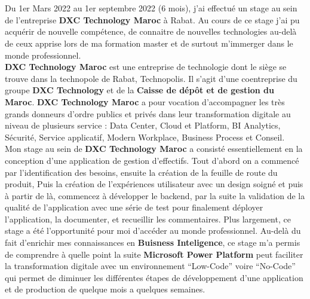 \titlespacing*{\chapter}{0pt}{0in}{0.3in}
\chapter*{}
\titlespacing*{\chapter}{0pt}{0.45in}{0.3in}%

Du 1er Mars 2022 au 1er septembre 2022 (6 mois), j’ai effectué un stage au sein de l’entreprise \textbf{DXC Technology Maroc} à Rabat. Au cours de ce stage j'ai pu acquérir de nouvelle compétence, de connaitre de nouvelles technologies au-delà de ceux apprise lors de ma formation master et de surtout m'immerger dans le monde professionnel. \\ 

\textbf{DXC Technology Maroc} est une entreprise de technologie dont le siège se trouve dans la technopole de Rabat, Technopolis. Il s’agit d’une coentreprise du groupe \textbf{DXC Technology} et de la \textbf{Caisse de dépôt et de gestion du Maroc}. \textbf{DXC Technology Maroc} a pour vocation d’accompagner les très grands donneurs d’ordre publics et privés dans leur transformation digitale au niveau de plusieurs service : Data Center, Cloud et Platform, BI Analytics, Sécurité, Service applicatif, Modern Workplace, Business Process et Conseil.\\ 

Mon stage au sein de \textbf{DXC Technology Maroc} a consisté essentiellement en la conception d'une application de gestion d'effectifs. Tout d'abord on a commencé par l'identification des besoins, ensuite la création de la feuille de route du produit, Puis la création de l'expériences utilisateur avec un design soigné et puis à partir de là, commencez à développer le backend, par la suite la validation de la qualité de l'application avec une série de test pour finalement déployer l'application, la documenter, et recueillir les commentaires. Plus largement, ce stage a été l’opportunité pour moi d'accéder au monde professionnel. Au-delà du fait d’enrichir mes connaissances en \textbf{Buisness Inteligence}, ce stage m’a permis de comprendre à quelle point la suite \textbf{Microsoft Power Platform} peut faciliter la transformation digitale avec un environnement “Low-Code” voire “No-Code” qui permet de diminuer les différentes étapes de développement d'une application et de production de quelque mois a quelques semaines.\\

